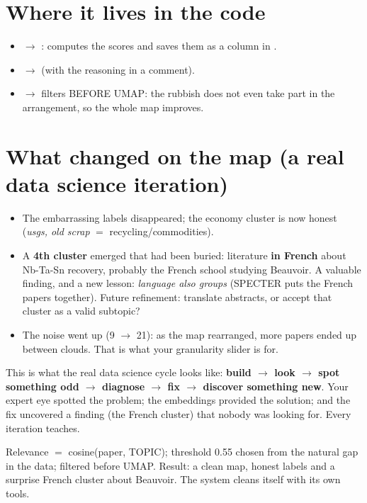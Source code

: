 \documentclass[11pt,a4paper]{article}
\begin{document}
\section{Where it lives in the code}

\begin{itemize}
  \item {} $\rightarrow$ : computes the scores and
        saves them as a  column in .
  \item {} $\rightarrow$  (with the
        reasoning in a comment).
  \item {} $\rightarrow$ filters BEFORE UMAP: the rubbish does not even take
        part in the arrangement, so the whole map improves.
\end{itemize}

\section{What changed on the map (a real data science iteration)}

\begin{itemize}
  \item The embarrassing labels disappeared; the economy cluster is now honest
        (\emph{usgs, old scrap} $=$ recycling/commodities).
  \item A \textbf{4th cluster} emerged that had been buried: literature \textbf{in French}
        about Nb-Ta-Sn recovery, probably the French school studying Beauvoir. A valuable
        finding, and a new lesson: \emph{language also groups} (SPECTER puts the French papers
        together). Future refinement: translate abstracts, or accept that cluster as a valid
        subtopic?
  \item The noise went up (9 $\rightarrow$ 21): as the map rearranged, more papers ended up
        between clouds. That is what your granularity slider is for.
\end{itemize}

\begin{ojo}
This is what the real data science cycle looks like: \textbf{build $\rightarrow$ look
$\rightarrow$ spot something odd $\rightarrow$ diagnose $\rightarrow$ fix $\rightarrow$
discover something new}. Your expert eye spotted the problem; the embeddings provided the
solution; and the fix uncovered a finding (the French cluster) that nobody was looking for.
Every iteration teaches.
\end{ojo}

\begin{resumen}
Relevance $=$ cosine(paper, TOPIC); threshold 0.55 chosen from the natural gap in the data;
filtered before UMAP. Result: a clean map, honest labels and a surprise French cluster about
Beauvoir. The system cleans itself with its own tools.
\end{resumen}
\end{document}

